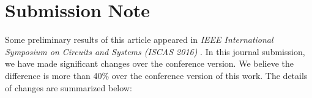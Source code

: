 %




\section{Submission Note}


Some preliminary results of this article appeared in {\it IEEE
International Symposium on Circuits and Systems (ISCAS 2016)
}\cite{zhao2016learning}. In this journal submission, we have made
significant changes over the conference version. We believe the
difference is more than 40\% over the conference version of this
work. The details of changes are summarized below:
